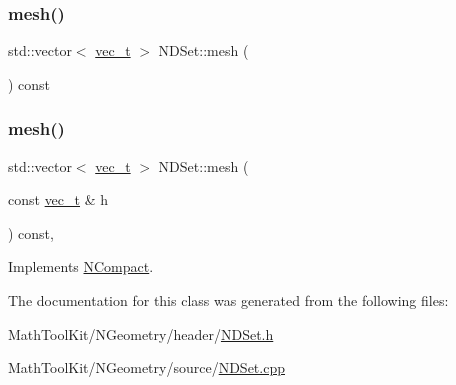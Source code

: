 \mbox{\label{class_n_d_set_a18273bfd133548e2012d1c8bd7cf566c}} 
\subsubsection{\texorpdfstring{mesh()}{mesh()}\hspace{0.1cm}{\footnotesize\ttfamily [1/2]}}
{\footnotesize\ttfamily std\+::vector$<$ \mbox{\hyperlink{_n_vector_8h_a0a2cfc67e738a3d73e4f12098c4c07f6}{vec\+\_\+t}} $>$ N\+D\+Set\+::mesh (\begin{DoxyParamCaption}{ }\end{DoxyParamCaption}) const}

\mbox{\label{class_n_d_set_ae57fe6ad1422876fa4256a28c3a26a13}} 
\subsubsection{\texorpdfstring{mesh()}{mesh()}\hspace{0.1cm}{\footnotesize\ttfamily [2/2]}}
{\footnotesize\ttfamily std\+::vector$<$ \mbox{\hyperlink{_n_vector_8h_a0a2cfc67e738a3d73e4f12098c4c07f6}{vec\+\_\+t}} $>$ N\+D\+Set\+::mesh (\begin{DoxyParamCaption}\item[{const \mbox{\hyperlink{_n_vector_8h_a0a2cfc67e738a3d73e4f12098c4c07f6}{vec\+\_\+t}} \&}]{h }\end{DoxyParamCaption}) const\hspace{0.3cm}{\ttfamily [override]}, {\ttfamily [virtual]}}



Implements \mbox{\hyperlink{class_n_compact_ad4cdc60c75ca433c63f44ec13063e2fe}{N\+Compact}}.



The documentation for this class was generated from the following files\+:\begin{DoxyCompactItemize}
\item 
Math\+Tool\+Kit/\+N\+Geometry/header/\mbox{\hyperlink{_n_d_set_8h}{N\+D\+Set.\+h}}\item 
Math\+Tool\+Kit/\+N\+Geometry/source/\mbox{\hyperlink{_n_d_set_8cpp}{N\+D\+Set.\+cpp}}\end{DoxyCompactItemize}
